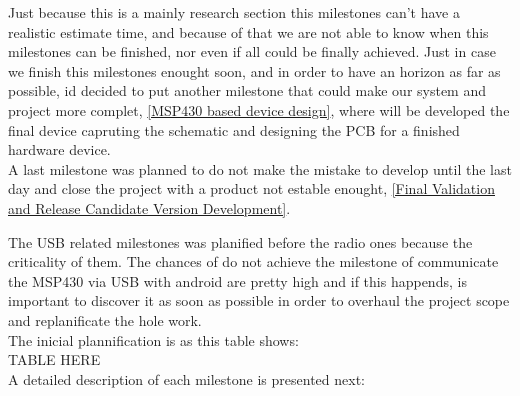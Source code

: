 	Just because this is a mainly research section this milestones can't have a realistic estimate time, and because of that we are not able to know when this milestones can be finished, nor even if all could be finally achieved. Just in case we finish this milestones enought soon, and in order to have an horizon as far as possible, id decided to put another milestone that could make our system and project more complet, \autoref{MSP430 based device design}, where will be developed the final device capruting the schematic and designing the PCB for a finished hardware device.\\
	
	A last milestone was planned to do not make the mistake to develop until the last day and close the project with a product not estable enought, \autoref{Final Validation and Release Candidate Version Development}.

	The USB related milestones was planified before the radio ones because the criticality of them. The chances of do not achieve the milestone of communicate the MSP430 via USB with android are pretty high and if this happends, is important to discover it as soon as possible in order to overhaul the project scope and replanificate the hole work.\\

	The inicial plannification is as this table shows:\\



	TABLE HERE\\




	A detailed description of each milestone is presented next: 


